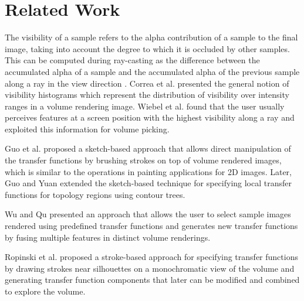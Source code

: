 \documentclass[twoside,twocolumn,10pt]{article}
\begin{document}

\section{Related Work}

The visibility of a sample refers to the alpha contribution of a sample to the final image, taking into account the degree to which it is occluded by other samples. This can be computed during ray-casting as the difference between the accumulated alpha of a sample and the accumulated alpha of the previous sample along a ray in the view direction \cite{emsenhuber_visibility_2008}.
Correa et al. presented the general notion of visibility histograms \cite{correa_visibility_2011} which represent the distribution of visibility over intensity ranges in a volume rendering image.
Wiebel et al. \cite{wiebel_wysiwyp:_2012} found that the user usually perceives features at a screen position with the highest visibility along a ray and exploited this information for volume picking.

Guo et al. \cite{guo_wysiwyg_2011} proposed a sketch-based approach that allows direct manipulation of the transfer functions by brushing strokes on top of volume rendered images, which is similar to the operations in painting applications for 2D images.
Later, Guo and Yuan \cite{guo_local_2013} extended the sketch-based technique for specifying local transfer functions for topology regions using contour trees.

Wu and Qu \cite{wu_interactive_2007} presented an approach that allows the user to select sample images rendered using predefined transfer functions and generates new transfer functions by fusing multiple features in distinct volume renderings.

Ropinski et al. \cite{ropinski_stroke-based_2008} proposed a stroke-based approach for specifying transfer functions by drawing strokes near silhouettes on a monochromatic view of the volume and generating transfer function components \cite{castro_transfer_1998} that later can be modified and combined to explore the volume.
\end{document}
